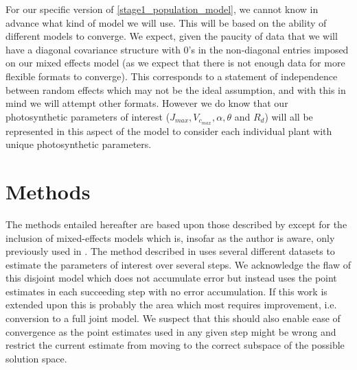 \documentclass[11pt]{article} %
\begin{document}
For our specific version of \eqref{stage1_population_model}, we cannot know in advance what kind of model we will use. This will be based on the ability of different models to converge. We expect, given the paucity of data that we will have a diagonal covariance structure with 0's in the non-diagonal entries imposed on our mixed effects model (as we expect that there is not enough data for more flexible formats to converge). This corresponds to a statement of independence between random effects which may not be the ideal assumption, and with this in mind we will attempt other formats. However we do know that our photosynthetic parameters of interest ($J_{max}, V_{c_{max}}, \alpha, \theta$ and $R_d$) will all be represented in this aspect of the model to consider each individual plant with unique photosynthetic parameters.

\section{Methods}
The methods entailed hereafter are based upon those described by \citet{YinUsingcombinedmeasurements2009} except for the inclusion of mixed-effects models which is, insofar as the author is aware, only previously used in \cite{QianEstimationphotosynthesisparameters2012}. The method described in \cite{YinUsingcombinedmeasurements2009} uses several different datasets to estimate the parameters of interest over several steps. We acknowledge the flaw of this disjoint model which does not accumulate error but instead uses the point estimates in each succeeding step with no error accumulation. If this work is extended upon this is probably the area which most requires improvement, i.e. conversion to a full joint model. We suspect that this should also enable ease of convergence as the point estimates used in any given step might be wrong and restrict the current estimate from moving to the correct subspace of the possible solution space.
\end{document}
